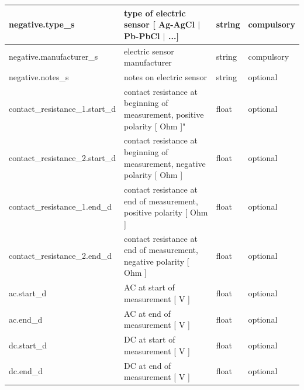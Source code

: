 \documentclass{article}
\begin{document}
\begin{table}[htb!]
\begin{tabular}{|l|p{3in}|l|l|}
		negative.type\_s & type of electric sensor [ Ag-AgCl $|$ Pb-PbCl $|$ ...] & string & compulsory \\ \hline
		negative.manufacturer\_s & electric sensor manufacturer & string & compulsory \\ \hline
		negative.notes\_s & notes on electric sensor & string & optional \\ \hline
		contact\_resistance\_1.start\_d & contact resistance at beginning of measurement, positive polarity [ Ohm ]" & float & optional \\ \hline
		contact\_resistance\_2.start\_d & contact resistance at beginning of measurement, negative polarity [ Ohm ] & float & optional \\ \hline
		contact\_resistance\_1.end\_d & contact resistance at end of measurement, positive polarity [ Ohm ] & float & optional \\ \hline
		contact\_resistance\_2.end\_d & contact resistance at end of measurement, negative polarity [ Ohm ] & float & optional \\ \hline
		ac.start\_d & AC at start of measurement [ V ] & float & optional \\ \hline
		ac.end\_d & AC at end of measurement [ V ] & float & optional \\ \hline
		dc.start\_d & DC at start of measurement [ V ] & float & optional \\ \hline
		dc.end\_d & DC at end of measurement [ V ] & float & optional \\ \hline
		
	\end{tabular}
	\label{tab:electric01}
\end{table}	
\end{document}
